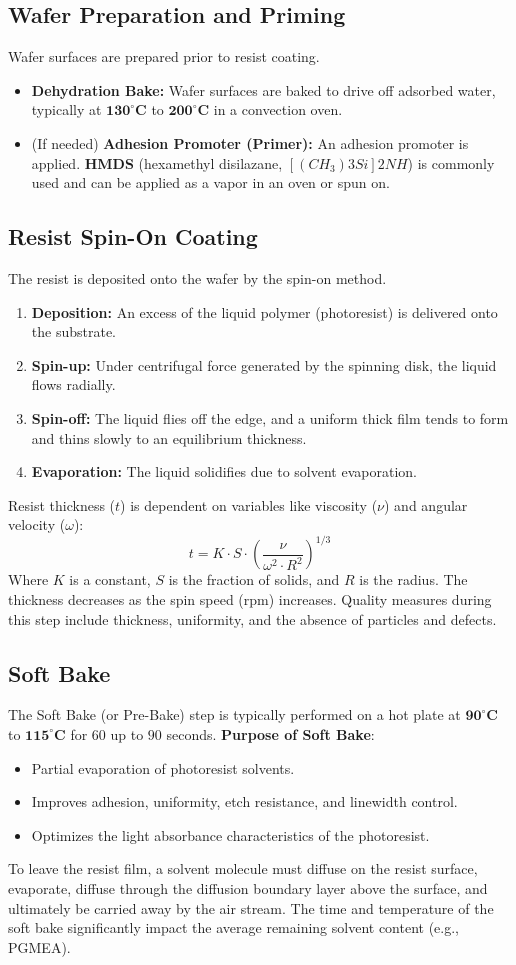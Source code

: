 \documentclass{report}
\begin{document}
\subsection{Wafer Preparation and Priming}
Wafer surfaces are prepared prior to resist coating. 
\begin{itemize} 
    \item \textbf{Dehydration Bake:} Wafer surfaces are baked to drive off adsorbed water, typically at $\mathbf{130^{\circ}C}$ to $\mathbf{200^{\circ}C}$ in a convection oven. 
    \item (If needed) \textbf{Adhesion Promoter (Primer):} An adhesion promoter is applied. \textbf{HMDS} (hexamethyl disilazane, $[(CH_{3}){3}Si]{2}NH$) is commonly used and can be applied as a vapor in an oven or spun on. 
\end{itemize}
\subsection{Resist Spin-On Coating}
The resist is deposited onto the wafer by the spin-on method. 
\begin{enumerate} 
    \item \textbf{Deposition:} An excess of the liquid polymer (photoresist) is delivered onto the substrate. 
    \item \textbf{Spin-up:} Under centrifugal force generated by the spinning disk, the liquid flows radially. 
    \item \textbf{Spin-off:} The liquid flies off the edge, and a uniform thick film tends to form and thins slowly to an equilibrium thickness. 
    \item \textbf{Evaporation:} The liquid solidifies due to solvent evaporation. 
\end{enumerate}
Resist thickness ($t$) is dependent on variables like viscosity ($\nu$) and angular velocity ($\omega$): $$t=K\cdot S\cdot\left(\frac{\nu}{\omega^{2}\cdot R^{2}}\right)^{1/3}$$ Where $K$ is a constant, $S$ is the fraction of solids, and $R$ is the radius. The thickness decreases as the spin speed (rpm) increases. Quality measures during this step include thickness, uniformity, and the absence of particles and defects.
\subsection{Soft Bake}
The Soft Bake (or Pre-Bake) step is typically performed on a hot plate at $\mathbf{90^{\circ}C}$ to $\mathbf{115^{\circ}C}$ for $60$ up to $90$ seconds.
\textbf{Purpose of Soft Bake}: 
\begin{itemize} 
    \item Partial evaporation of photoresist solvents. 
    \item Improves adhesion, uniformity, etch resistance, and linewidth control. 
    \item Optimizes the light absorbance characteristics of the photoresist. 
\end{itemize}
To leave the resist film, a solvent molecule must diffuse on the resist surface, evaporate, diffuse through the diffusion boundary layer above the surface, and ultimately be carried away by the air stream. The time and temperature of the soft bake significantly impact the average remaining solvent content (e.g., PGMEA).
\end{document}
